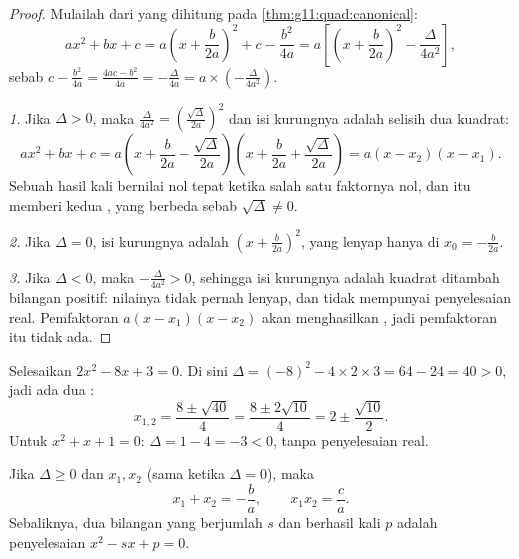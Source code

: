 \begin{proof}
Mulailah dari  yang dihitung pada \cref{thm:g11:quad:canonical}:
\[
ax^2+bx+c
= a\left(x + \frac{b}{2a}\right)^2 + c - \frac{b^2}{4a}
= a\left[\left(x + \frac{b}{2a}\right)^2 - \frac{\Delta}{4a^2}\right],
\]
sebab $c - \frac{b^2}{4a} = \frac{4ac - b^2}{4a} = -\frac{\Delta}{4a} =
a \times \left(-\frac{\Delta}{4a^2}\right)$.

\emph{1.} Jika $\Delta > 0$, maka $\frac{\Delta}{4a^2} =
\left(\frac{\sqrt\Delta}{2a}\right)^2$ dan isi kurungnya adalah selisih
dua kuadrat:
\[
ax^2+bx+c = a\left(x + \frac{b}{2a} - \frac{\sqrt\Delta}{2a}\right)
\left(x + \frac{b}{2a} + \frac{\sqrt\Delta}{2a}\right)
= a(x - x_2)(x - x_1).
\]
Sebuah hasil kali bernilai nol tepat ketika salah satu faktornya nol, dan itu
memberi kedua , yang berbeda sebab $\sqrt\Delta \neq 0$.

\emph{2.} Jika $\Delta = 0$, isi kurungnya adalah
$\left(x + \frac{b}{2a}\right)^2$, yang lenyap hanya di
$x_0 = -\frac{b}{2a}$.

\emph{3.} Jika $\Delta < 0$, maka $-\frac{\Delta}{4a^2} > 0$, sehingga isi
kurungnya adalah kuadrat ditambah bilangan positif: nilainya tidak pernah
lenyap, dan  tidak mempunyai penyelesaian real. Pemfaktoran
$a(x-x_1)(x-x_2)$ akan menghasilkan , jadi pemfaktoran itu tidak ada.
\end{proof}

\begin{example}\label{ex:g11:quad:solving}
Selesaikan $2x^2 - 8x + 3 = 0$. Di sini $\Delta = (-8)^2 - 4 \times 2 \times 3 =
64 - 24 = 40 > 0$, jadi ada dua :
\[
x_{1,2} = \frac{8 \pm \sqrt{40}}{4} = \frac{8 \pm 2\sqrt{10}}{4}
= 2 \pm \frac{\sqrt{10}}{2}.
\]
Untuk $x^2 + x + 1 = 0$: $\Delta = 1 - 4 = -3 < 0$, tanpa penyelesaian real.
\end{example}

\begin{proposition}\label{prop:g11:quad:vieta}
Jika $\Delta \geq 0$ dan $x_1, x_2$  (sama ketika $\Delta = 0$),
maka
\[
x_1 + x_2 = -\frac{b}{a},
\qquad
x_1 x_2 = \frac{c}{a} .
\]
Sebaliknya, dua bilangan yang berjumlah $s$ dan berhasil kali $p$ adalah
penyelesaian $x^2 - sx + p = 0$.
\end{proposition}

